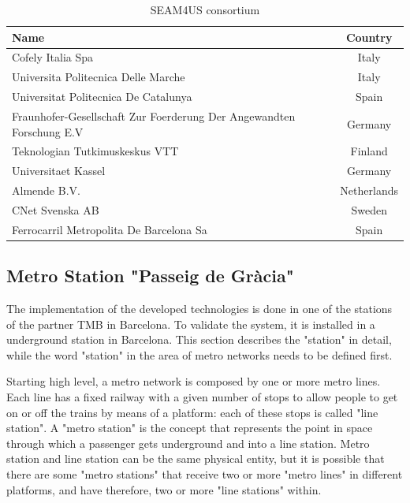 \begin{table}[htbp]
  \centering
  
    \begin{tabularx}{\columnwidth}{|X|c|}
	\hline
    \textbf{Name} & \textbf{Country} \\
	\hline
    Cofely Italia Spa & Italy \\
	\hline
    Universita Politecnica Delle Marche & Italy \\
	\hline
    Universitat Politecnica De Catalunya & Spain \\
	\hline
    Fraunhofer-Gesellschaft Zur Foerderung Der Angewandten Forschung E.V & Germany \\
	\hline
    Teknologian Tutkimuskeskus VTT & Finland \\
	\hline
    Universitaet Kassel & Germany \\
	\hline
    Almende B.V. & Netherlands \\
    	\hline
    CNet Svenska AB & Sweden \\
    	\hline
    	Ferrocarril Metropolita De Barcelona Sa & Spain \\
	\hline
    \end{tabularx}%
    
  \caption{SEAM4US consortium}%
  \label{tab:SEAM4USconsotium}%
\end{table}%


\subsection{Metro Station "Passeig de Gr\`{a}cia"}
\label{subsec:station}


The implementation of the developed technologies is done in one of the stations of the partner TMB in Barcelona.
To validate the system, it is installed in a underground station in Barcelona.
This section describes the "station" in detail, while the word "station" in the area of metro networks needs to be defined first.

Starting high level, a metro network is composed by one or more metro lines. Each line has a fixed railway with a given number of stops to allow people to get on or off the trains by means of a platform: each of these stops is called "line station". A "metro station" is the concept that represents the point in space through which a passenger gets underground and into a line station. Metro station and line station can be the same physical entity, but it is possible that there are some "metro stations" that receive two or more "metro lines" in different platforms, and have therefore, two or more "line stations" within.

